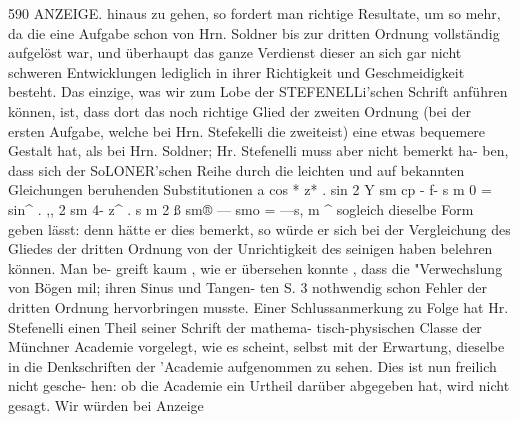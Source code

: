 \documentclass[12pt,a4paper]{article}
\begin{document}
\newpage
590 ANZEIGE.\newline
hinaus zu gehen, so fordert man richtige Resultate, um so mehr, da die eine Aufgabe schon von Hrn.\newline
Soldner bis zur dritten Ordnung vollständig aufgelöst war, und überhaupt das ganze Verdienst dieser\newline
an sich gar nicht schweren Entwicklungen lediglich in ihrer Richtigkeit und Geschmeidigkeit besteht.\newline
Das einzige, was wir zum Lobe der STEFENELLi'schen Schrift anführen können, ist, dass dort das noch\newline
richtige Glied der zweiten Ordnung (bei der ersten Aufgabe, welche bei Hrn. Stefekelli die zweiteist)\newline
eine etwas bequemere Gestalt hat, als bei Hrn. Soldner; Hr. Stefenelli muss aber nicht bemerkt ha-\newline
ben, dass sich der SoLONER'schen Reihe durch die leichten und auf bekannten Gleichungen beruhenden\newline
Substitutionen\newline
a cos * z* . sin 2 Y\newline
sm cp - f- s m 0 =\newline
sin\^{}\newline
. ,, 2 sm 4- z\^{} . s m 2 ß\newline
sm® --- smo = ---s, m \^{}\newline
sogleich dieselbe Form geben lässt: denn hätte er dies bemerkt, so würde er sich bei der Vergleichung\newline
des Gliedes der dritten Ordnung von der Unrichtigkeit des seinigen haben belehren können. Man be-\newline
greift kaum , wie er übersehen konnte , dass die "Verwechslung von Bögen mil; ihren Sinus und Tangen-\newline
ten S. 3 nothwendig schon Fehler der dritten Ordnung hervorbringen musste.\newline
Einer Schlussanmerkung zu Folge hat Hr. Stefenelli einen Theil seiner Schrift der mathema-\newline
tisch-physischen Classe der Münchner Academie vorgelegt, wie es scheint, selbst mit der Erwartung,\newline
dieselbe in die Denkschriften der 'Academie aufgenommen zu sehen. Dies ist nun freilich nicht gesche-\newline
hen: ob die Academie ein Urtheil darüber abgegeben hat, wird nicht gesagt. Wir würden bei Anzeige\newline
\end{document}
